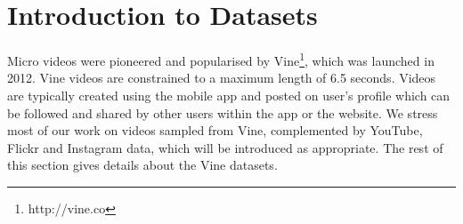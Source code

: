 \section{Introduction to Datasets}
Micro videos were pioneered and popularised by Vine\footnote{\scriptsize http://vine.co}, which was launched in 2012. Vine videos are constrained to a maximum length of 6.5 seconds. Videos are typically created using the mobile app and posted on user's profile which can be followed and shared by other users within the app or the website. %
We stress most of our work on videos sampled from Vine, complemented by YouTube, Flickr and Instagram data, which will be introduced as appropriate. The rest of this section gives details about the Vine datasets.
%
%

